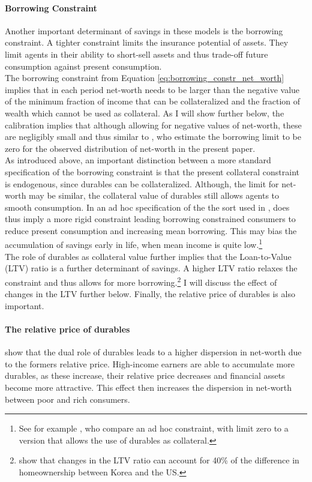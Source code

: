 \documentclass[12pt,a4paper,leqno]{article}
\theoremstyle{definition}
\begin{document}
\paragraph{Borrowing Constraint} Another important determinant of savings in these models is the borrowing constraint. A tighter constraint limits the insurance potential of assets. They limit agents in their ability to short-sell assets and thus trade-off future consumption against present consumption. \\ 
The borrowing constraint from Equation \ref{eq:borrowing_constr_net_worth} implies that in each period net-worth needs to be larger than the negative value of the minimum fraction of income that can be collateralized and the fraction of wealth which cannot be used as collateral. As I will show further below, the calibration implies that although allowing for negative values of net-worth, these are negligibly small and thus similar to \cite{hintermaier2011}, who estimate the borrowing limit to be zero for the observed distribution of net-worth in the present paper. 
\\ 
As introduced above, an important distinction between a more standard specification of the borrowing constraint is that the present collateral constraint is endogenous, since durables can be collateralized. Although, the limit for net-worth may be similar, the collateral value of durables still allows agents to smooth consumption. In an ad hoc specification of the the sort used in \cite{hintermaier2011}, does thus imply a more rigid constraint leading borrowing constrained consumers to reduce present consumption and increasing mean borrowing. This may bias the accumulation of savings early in life, when mean income is quite low.\footnote{See for example \cite{FV&K2011}, who compare an ad hoc constraint, with limit zero to a version that allows the use of durables as collateral.} \\ The role of durables as collateral value further implies that the Loan-to-Value (LTV) ratio is a further determinant of savings. A higher LTV ratio relaxes the constraint and thus allows for more borrowing.\footnote{\cite{cho2012accounting} show that changes in the LTV ratio can account for 40\% of the difference in homeownership between Korea and the US.} I will discuss the effect of changes in the LTV further below.
Finally, the relative price of durables is also important.

\paragraph{The relative price of durables} \cite{FV&K2011} show that the dual role of durables leads to a higher dispersion in net-worth due to the formers relative price. High-income earners are able to accumulate more durables, as these increase, their relative price decreases and financial assets become more attractive. This effect then increases the dispersion in net-worth between poor and rich consumers. 
\end{document}
